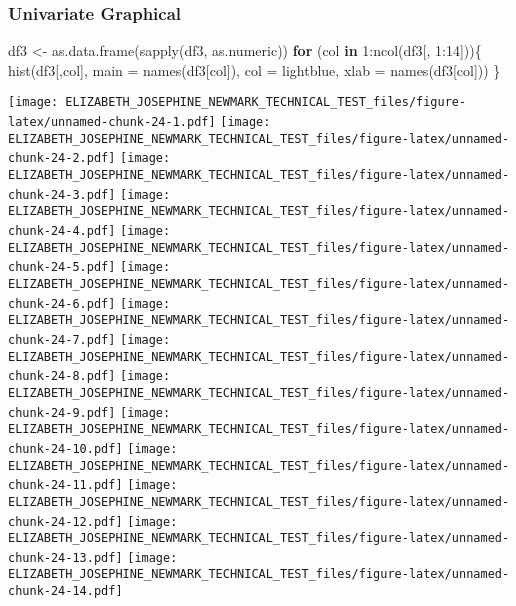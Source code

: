 \documentclass[
]{article}
\newenvironment{Shaded}{\begin{snugshade}}{\end{snugshade}}
\newcommand{\AttributeTok}[1]{\textcolor[rgb]{0.77,0.63,0.00}{#1}}
\newcommand{\ControlFlowTok}[1]{\textcolor[rgb]{0.13,0.29,0.53}{\textbf{#1}}}
\newcommand{\DecValTok}[1]{\textcolor[rgb]{0.00,0.00,0.81}{#1}}
\newcommand{\FunctionTok}[1]{\textcolor[rgb]{0.00,0.00,0.00}{#1}}
\newcommand{\NormalTok}[1]{#1}
\newcommand{\OtherTok}[1]{\textcolor[rgb]{0.56,0.35,0.01}{#1}}
\newcommand{\SpecialCharTok}[1]{\textcolor[rgb]{0.00,0.00,0.00}{#1}}
\newcommand{\StringTok}[1]{\textcolor[rgb]{0.31,0.60,0.02}{#1}}
\begin{document}
\hypertarget{univariate-graphical}{%
\subsubsection{Univariate Graphical}\label{univariate-graphical}}

\begin{Shaded}
\begin{Highlighting}[]
\NormalTok{df3 }\OtherTok{\textless{}{-}} \FunctionTok{as.data.frame}\NormalTok{(}\FunctionTok{sapply}\NormalTok{(df3, as.numeric))}
\ControlFlowTok{for}\NormalTok{ (col }\ControlFlowTok{in} \DecValTok{1}\SpecialCharTok{:}\FunctionTok{ncol}\NormalTok{(df3[, }\DecValTok{1}\SpecialCharTok{:}\DecValTok{14}\NormalTok{]))\{}
  \FunctionTok{hist}\NormalTok{(df3[,col], }\AttributeTok{main =} \FunctionTok{names}\NormalTok{(df3[col]), }\AttributeTok{col =} \StringTok{\textquotesingle{}lightblue\textquotesingle{}}\NormalTok{, }\AttributeTok{xlab =} \FunctionTok{names}\NormalTok{(df3[col]))}
\NormalTok{\}}
\end{Highlighting}
\end{Shaded}

\texttt{[image: ELIZABETH\_JOSEPHINE\_NEWMARK\_TECHNICAL\_TEST\_files/figure-latex/unnamed-chunk-24-1.pdf]}
\texttt{[image: ELIZABETH\_JOSEPHINE\_NEWMARK\_TECHNICAL\_TEST\_files/figure-latex/unnamed-chunk-24-2.pdf]}
\texttt{[image: ELIZABETH\_JOSEPHINE\_NEWMARK\_TECHNICAL\_TEST\_files/figure-latex/unnamed-chunk-24-3.pdf]}
\texttt{[image: ELIZABETH\_JOSEPHINE\_NEWMARK\_TECHNICAL\_TEST\_files/figure-latex/unnamed-chunk-24-4.pdf]}
\texttt{[image: ELIZABETH\_JOSEPHINE\_NEWMARK\_TECHNICAL\_TEST\_files/figure-latex/unnamed-chunk-24-5.pdf]}
\texttt{[image: ELIZABETH\_JOSEPHINE\_NEWMARK\_TECHNICAL\_TEST\_files/figure-latex/unnamed-chunk-24-6.pdf]}
\texttt{[image: ELIZABETH\_JOSEPHINE\_NEWMARK\_TECHNICAL\_TEST\_files/figure-latex/unnamed-chunk-24-7.pdf]}
\texttt{[image: ELIZABETH\_JOSEPHINE\_NEWMARK\_TECHNICAL\_TEST\_files/figure-latex/unnamed-chunk-24-8.pdf]}
\texttt{[image: ELIZABETH\_JOSEPHINE\_NEWMARK\_TECHNICAL\_TEST\_files/figure-latex/unnamed-chunk-24-9.pdf]}
\texttt{[image: ELIZABETH\_JOSEPHINE\_NEWMARK\_TECHNICAL\_TEST\_files/figure-latex/unnamed-chunk-24-10.pdf]}
\texttt{[image: ELIZABETH\_JOSEPHINE\_NEWMARK\_TECHNICAL\_TEST\_files/figure-latex/unnamed-chunk-24-11.pdf]}
\texttt{[image: ELIZABETH\_JOSEPHINE\_NEWMARK\_TECHNICAL\_TEST\_files/figure-latex/unnamed-chunk-24-12.pdf]}
\texttt{[image: ELIZABETH\_JOSEPHINE\_NEWMARK\_TECHNICAL\_TEST\_files/figure-latex/unnamed-chunk-24-13.pdf]}
\texttt{[image: ELIZABETH\_JOSEPHINE\_NEWMARK\_TECHNICAL\_TEST\_files/figure-latex/unnamed-chunk-24-14.pdf]}
\end{document}

